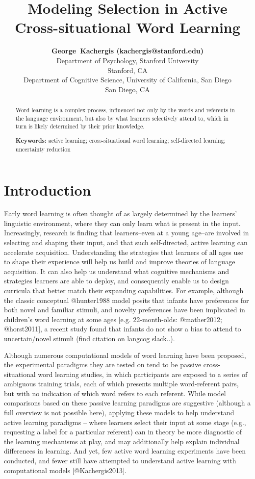 \documentclass[10pt, letterpaper]{article}
\title{Modeling Selection in Active Cross-situational Word Learning}
\author{{\large \bf George~Kachergis (kachergis@stanford.edu)} \\ Department of Psychology, Stanford University \\ Stanford, CA \AND {\large \bf Martin~Zettersten (mzettersten@ucsd.edu)} \\ Department of Cognitive Science, University of California, San Diego \\ San Diego, CA}
\begin{document}
\maketitle

\begin{abstract}
Word learning is a complex process, influenced not only by the words and
referents in the language environment, but also by what learners
selectively attend to, which in turn is likely determined by their prior
knowledge.

\textbf{Keywords:}
active learning; cross-situational word learning; self-directed
learning; uncertainty reduction
\end{abstract}

\section{Introduction}\label{introduction}

Early word learning is often thought of as largely determined by the
learners' linguistic environment, where they can only learn what is
present in the input. Increasingly, research is finding that
learners--even at a young age--are involved in selecting and shaping
their input, and that such self-directed, active learning can accelerate
acquisition. Understanding the strategies that learners of all ages use
to shape their experience will help us build and improve theories of
language acquisition. It can also help us understand what cognitive
mechanisms and strategies learners are able to deploy, and consequently
enable us to design curricula that better match their expanding
capabilities. For example, although the classic conceptual @hunter1988
model posits that infants have preferences for both novel and familiar
stimuli, and novelty preferences have been implicated in children's word
learning at some ages {[}e.g. 22-month-olds: @mather2012; @horst2011{]},
a recent study found that infants do not show a bias to attend to
uncertain/novel stimuli (find citation on langcog slack..).

Although numerous computational models of word learning have been
proposed, the experimental paradigms they are tested on tend to be
passive cross-situational word learning studies, in which participants
are exposed to a series of ambiguous training trials, each of which
presents multiple word-referent pairs, but with no indication of which
word refers to each referent. While model comparisons based on these
passive learning paradigms are suggestive (although a full overview is
not possible here), applying these models to help understand active
learning paradigms -- where learners select their input at some stage
(e.g., requesting a label for a particular referent) can in theory be
more diagnostic of the learning mechanisms at play, and may additionally
help explain individual differences in learning. And yet, few active
word learning experiments have been conducted, and fewer still have
attempted to understand active learning with computational models
{[}@Kachergis2013{]}.
\end{document}

